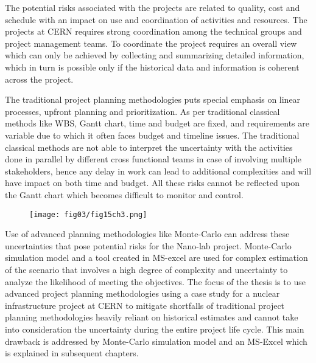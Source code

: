 The potential risks associated with the projects are related to quality, cost and schedule with an impact on use and coordination of activities and resources. The projects at CERN requires strong coordination among the technical groups and project management teams. To coordinate the project requires an overall view which can only be achieved by collecting and summarizing detailed information, which in turn is possible only if the historical data and information is coherent across the project.

The traditional project planning methodologies puts special emphasis on linear processes, upfront planning and prioritization. As per traditional classical methods like WBS, Gantt chart, time and budget are fixed, and requirements are variable due to which it often faces budget and timeline issues. The traditional classical methods are not able to interpret the uncertainty with the activities done in parallel by different cross functional teams in case of involving multiple stakeholders, hence any delay in work can lead to additional complexities and will have impact on both time and budget. All these risks cannot be reflected upon the Gantt chart which becomes difficult to monitor and control. 

	\begin{figure}
	\centering
	\texttt{[image: fig03/fig15ch3.png]}
\end{figure}


Use of advanced planning methodologies like Monte-Carlo can address these uncertainties that pose potential risks for the Nano-lab project. Monte-Carlo simulation model and a tool created in MS-excel are used for complex estimation of the scenario that involves a high degree of complexity and uncertainty to analyze the likelihood of meeting the objectives. The focus of the thesis is to use advanced project planning methodologies using a case study for a nuclear infrastructure project at CERN to mitigate shortfalls of traditional project planning methodologies heavily reliant on historical estimates and cannot take into consideration the uncertainty during the entire project life cycle. This main drawback is addressed by Monte-Carlo simulation model and an MS-Excel which is explained in subsequent chapters.








